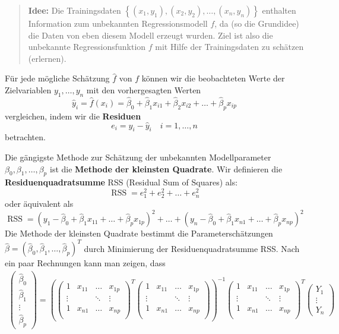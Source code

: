 \documentclass[
  ngerman,
]{book}
\begin{document}
\begin{quote}
\textbf{Idee:} Die Trainingsdaten \(\left\{(x_1,y_1),(x_2,y_2),\dots,(x_n,y_n)\right\}\) enthalten Information zum unbekannten Regressionsmodell \(f\), da (so die Grundidee) die Daten von eben diesem Modell erzeugt wurden. Ziel ist also die unbekannte Regressionsfunktion \(f\) mit Hilfe der Trainingsdaten zu schätzen (erlernen).
\end{quote}

Für jede mögliche Schätzung \(\hat{f}\) von \(f\) können wir die beobachteten Werte der Zielvariablen \(y_1,\dots,y_n\) mit den vorhergesagten Werten
\[
\hat{y}_i=\hat{f}(x_i)=\hat{\beta}_0 + \hat{\beta}_1 x_{i1} +  \hat{\beta}_2 x_{i2} + \dots + \hat{\beta}_p x_{ip}
\]
vergleichen, indem wir die \textbf{Residuen}
\[
e_i = y_i-\hat{y}_i\quad i=1,\dots,n
\]
betrachten.

Die gängigste Methode zur Schätzung der unbekannten Modellparameter \(\beta_0,\beta_1,\dots,\beta_p\) ist die \textbf{Methode der kleinsten Quadrate}. Wir definieren die \textbf{Residuenquadratsumme} RSS (Residual Sum of Squares) als:
\[
\operatorname{RSS}=e_1^2+e_2^2+\dots +e_n^2
\]
oder äquivalent als
\[
\operatorname{RSS}=
(y_1-\hat{\beta}_0 + \hat{\beta}_1 x_{11} +  \dots + \hat{\beta}_p x_{1p})^2 + 
\dots +
(y_n-\hat{\beta}_0 + \hat{\beta}_1 x_{n1} +  \dots + \hat{\beta}_p x_{np})^2
\]
Die Methode der kleinsten Quadrate bestimmt die Parameterschätzungen \(\hat{\beta}=(\hat{\beta}_0,\hat{\beta}_1,\dots,\hat{\beta}_p)^T\) durch Minimierung der Residuenquadratsumme RSS. Nach ein paar Rechnungen kann man zeigen, dass\\
\begin{align*}
\left(
  \begin{matrix}
  \hat{\beta}_0\\
  \hat{\beta}_1\\
  \vdots\\
  \hat{\beta}_p
  \end{matrix}
\right)=
\left(
  \left(\begin{matrix}
  1&x_{11}&\dots & x_{1p}\\
  \vdots&&\ddots & \vdots\\
  1&x_{n1}&\dots & x_{np}\\
  \end{matrix}\right)^T
  \left(\begin{matrix}
  1&x_{11}&\dots & x_{1p}\\
  \vdots&&\ddots & \vdots\\
  1&x_{n1}&\dots & x_{np}\\
  \end{matrix}\right)
\right)^{-1}
\left(\begin{matrix}
  1&x_{11}&\dots & x_{1p}\\
  \vdots&&\ddots & \vdots\\
  1&x_{n1}&\dots & x_{np}\\
  \end{matrix}\right)^T
\left(
  \begin{matrix}
  Y_1\\
  \vdots\\
  Y_n
  \end{matrix}
\right)
\end{align*}
\end{document}
